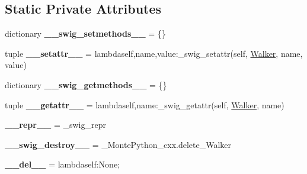 \subsection*{Static Private Attributes}
\begin{DoxyCompactItemize}
\item 
\hypertarget{classMontePython__cxx_1_1Walker_a186d545b4e6837e51ee91bd61df20b14}{}dictionary {\bfseries \+\_\+\+\_\+swig\+\_\+setmethods\+\_\+\+\_\+} = \{\}\label{classMontePython__cxx_1_1Walker_a186d545b4e6837e51ee91bd61df20b14}

\item 
\hypertarget{classMontePython__cxx_1_1Walker_ad6bf44d3ce4bdb4b9d2f85e93c064970}{}tuple {\bfseries \+\_\+\+\_\+setattr\+\_\+\+\_\+} = lambdaself,name,value\+:\+\_\+swig\+\_\+setattr(self, \hyperlink{classMontePython__cxx_1_1Walker}{Walker}, name, value)\label{classMontePython__cxx_1_1Walker_ad6bf44d3ce4bdb4b9d2f85e93c064970}

\item 
\hypertarget{classMontePython__cxx_1_1Walker_a9ccb353b6b57b101895f2b8fc056289f}{}dictionary {\bfseries \+\_\+\+\_\+swig\+\_\+getmethods\+\_\+\+\_\+} = \{\}\label{classMontePython__cxx_1_1Walker_a9ccb353b6b57b101895f2b8fc056289f}

\item 
\hypertarget{classMontePython__cxx_1_1Walker_a92eacc828cb585214f8489d417924171}{}tuple {\bfseries \+\_\+\+\_\+getattr\+\_\+\+\_\+} = lambdaself,name\+:\+\_\+swig\+\_\+getattr(self, \hyperlink{classMontePython__cxx_1_1Walker}{Walker}, name)\label{classMontePython__cxx_1_1Walker_a92eacc828cb585214f8489d417924171}

\item 
\hypertarget{classMontePython__cxx_1_1Walker_a6aea221e99811b6b3cef4bd1b433ba59}{}{\bfseries \+\_\+\+\_\+repr\+\_\+\+\_\+} = \+\_\+swig\+\_\+repr\label{classMontePython__cxx_1_1Walker_a6aea221e99811b6b3cef4bd1b433ba59}

\item 
\hypertarget{classMontePython__cxx_1_1Walker_a1f81a5beae08035d2cea9140a1c14480}{}{\bfseries \+\_\+\+\_\+swig\+\_\+destroy\+\_\+\+\_\+} = \+\_\+\+Monte\+Python\+\_\+cxx.\+delete\+\_\+\+Walker\label{classMontePython__cxx_1_1Walker_a1f81a5beae08035d2cea9140a1c14480}

\item 
\hypertarget{classMontePython__cxx_1_1Walker_a0a83d8a7702ebfa70e98ef4a58803a67}{}{\bfseries \+\_\+\+\_\+del\+\_\+\+\_\+} = lambdaself\+:\+None;\label{classMontePython__cxx_1_1Walker_a0a83d8a7702ebfa70e98ef4a58803a67}

\end{DoxyCompactItemize}


